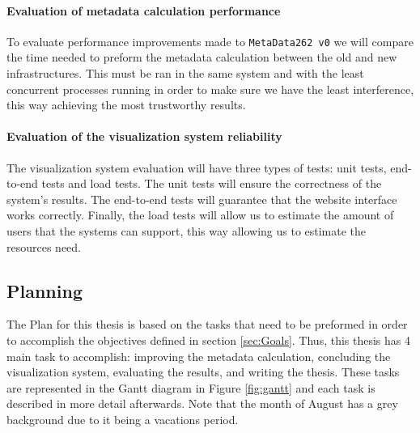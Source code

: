 \documentclass[runningheads]{llncs}
\begin{document}
\paragraph{Evaluation of metadata calculation performance}
To evaluate performance improvements made to \texttt{MetaData262 v0} we will compare the time needed to preform the metadata calculation between the old and new infrastructures. This must be ran in the same system and with the least concurrent processes running in order to make sure we have the least interference, this way achieving the most trustworthy results.



\paragraph{Evaluation of the visualization system reliability}
The visualization system evaluation will have three types of tests: unit tests, end-to-end tests and load tests. The unit tests will ensure the correctness of the system's results. The end-to-end tests will guarantee that the website interface works correctly. Finally, the load tests will allow us to estimate the amount of users that the systems can support, this way allowing us to estimate the resources need.



\subsection{Planning}
\label{sub:planning}


The Plan for this thesis is based on the tasks that need to be preformed in order to accomplish the objectives defined in section \ref{sec:Goals}. Thus, this thesis has 4 main task to accomplish: improving the metadata calculation, concluding the visualization system, evaluating the results, and writing the thesis. These tasks are represented in the Gantt diagram in Figure \ref{fig:gantt} and each task is described in more detail afterwards. Note that the month of August has a grey background due to it being a vacations period.
\end{document}
